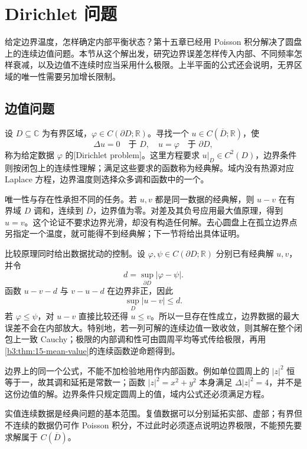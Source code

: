 \section{Dirichlet 问题}
\label{b3:sec:1601}

给定边界温度，怎样确定内部平衡状态？第十五章已经用 Poisson 积分解决了圆盘上的连续边值问题。本节从这个解出发，研究边界误差怎样传入内部、不同频率怎样衰减，以及边值不连续时应当采用什么极限。上半平面的公式还会说明，无界区域的唯一性需要另加增长限制。

\subsection{边值问题}
\label{b3:subsec:160101}

设 \(D\subseteq\mathbb C\) 为有界区域，\(\varphi\in C(\partial D;\mathbb R)\)。寻找一个 \(u\in C(\overline D;\mathbb R)\)，使
\[
 \Delta u=0\quad\text{于 }D,
 \quad
 u=\varphi\quad\text{于 }\partial D,
\]
称为给定数据 \(\varphi\) 的[Dirichlet problem]。这里方程要求 \(u|_D\in C^2(D)\)，边界条件则按闭包上的连续性理解；满足这些要求的函数称为经典解。域内没有热源对应 Laplace 方程，边界温度则选择众多调和函数中的一个。

\ProseParagraphBreak
唯一性与存在性承担不同的任务。若 \(u,v\) 都是同一数据的经典解，则 \(u-v\) 在有界域 \(D\) 调和，连续到 \(\overline D\)，边界值为零。对差及其负号应用最大值原理，得到 \(u=v\)。这个论证不要求边界光滑，却没有构造任何解。去心圆盘上在孤立边界点另指定一个温度，就可能得不到经典解；下一节将给出具体证明。

\ProseParagraphBreak
比较原理同时给出数据扰动的控制。设 \(\varphi,\psi\in C(\partial D;\mathbb R)\) 分别已有经典解 \(u,v\)，并令
\[
 d=\sup_{\partial D}|\varphi-\psi|.
\]
函数 \(u-v-d\) 与 \(v-u-d\) 在边界非正，因此
\[
 \sup_D|u-v|\le d.
\]
若 \(\varphi\le\psi\)，对 \(u-v\) 直接比较还得 \(u\le v\)。所以一旦存在性成立，边界数据的最大误差不会在内部放大。特别地，若一列可解的连续边值一致收敛，则其解在整个闭包上一致 Cauchy；极限的内部调和性可由圆周平均等式传给极限，再用\cref{b3:thm:15-mean-value}的连续函数逆命题得到。

\ProseParagraphBreak
边界上的同一个公式，不能不加检验地用作内部函数。例如单位圆周上的 \(|z|^2\) 恒等于一，故其调和延拓是常数一；函数 \(|z|^2=x^2+y^2\) 本身满足 \(\Delta|z|^2=4\)，并不是这份边值的解。边界条件只规定圆周上的值，域内公式还必须满足方程。

\ProseParagraphBreak
实值连续数据是经典问题的基本范围。复值数据可以分别延拓实部、虚部；有界但不连续的数据仍可作 Poisson 积分，不过此时必须逐点说明边界极限，不能预先要求解属于 \(C(\overline D)\)。

